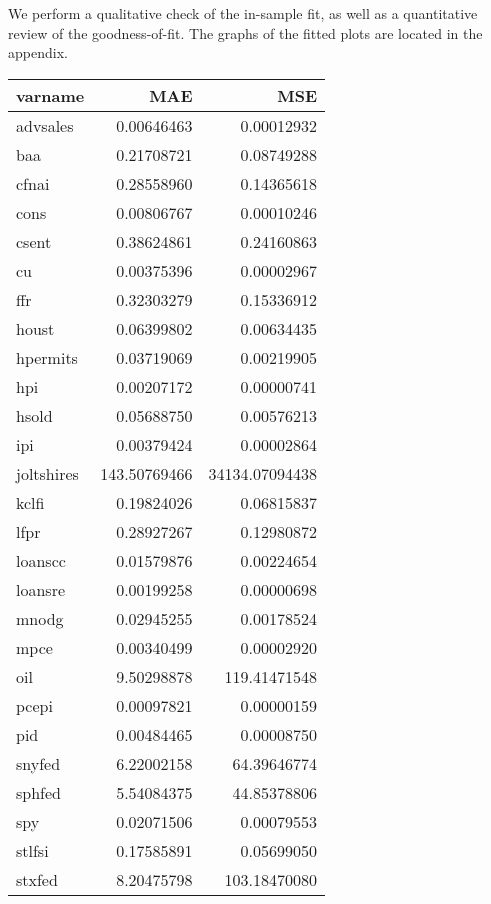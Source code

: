 \documentclass[11pt, letterpaper]{article}\usepackage[]{graphicx}\usepackage[]{color}
\begin{document}
We perform a qualitative check of the in-sample fit, as well as a quantitative review of the goodness-of-fit. The graphs of the fitted plots are located in the appendix.
\begin{table}[H]
\centering
\begingroup\footnotesize
\begin{tabular}{lrr}
  \hline
varname & MAE & MSE \\ 
  \hline
advsales & 0.00646463 & 0.00012932 \\ 
  baa & 0.21708721 & 0.08749288 \\ 
  cfnai & 0.28558960 & 0.14365618 \\ 
  cons & 0.00806767 & 0.00010246 \\ 
  csent & 0.38624861 & 0.24160863 \\ 
  cu & 0.00375396 & 0.00002967 \\ 
  ffr & 0.32303279 & 0.15336912 \\ 
  houst & 0.06399802 & 0.00634435 \\ 
  hpermits & 0.03719069 & 0.00219905 \\ 
  hpi & 0.00207172 & 0.00000741 \\ 
  hsold & 0.05688750 & 0.00576213 \\ 
  ipi & 0.00379424 & 0.00002864 \\ 
  joltshires & 143.50769466 & 34134.07094438 \\ 
  kclfi & 0.19824026 & 0.06815837 \\ 
  lfpr & 0.28927267 & 0.12980872 \\ 
  loanscc & 0.01579876 & 0.00224654 \\ 
  loansre & 0.00199258 & 0.00000698 \\ 
  mnodg & 0.02945255 & 0.00178524 \\ 
  mpce & 0.00340499 & 0.00002920 \\ 
  oil & 9.50298878 & 119.41471548 \\ 
  pcepi & 0.00097821 & 0.00000159 \\ 
  pid & 0.00484465 & 0.00008750 \\ 
  snyfed & 6.22002158 & 64.39646774 \\ 
  sphfed & 5.54084375 & 44.85378806 \\ 
  spy & 0.02071506 & 0.00079553 \\ 
  stlfsi & 0.17585891 & 0.05699050 \\ 
  stxfed & 8.20475798 & 103.18470080 \\ 

\end{tabular}
\end{table}
\end{document}
